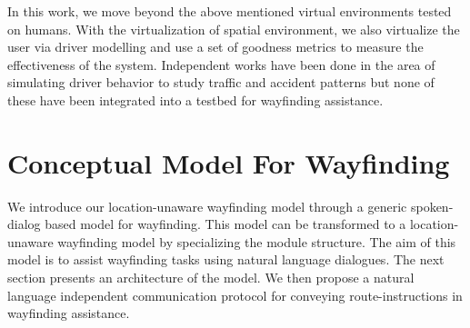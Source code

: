\documentclass{iitkthesis}
\begin{document}
In this work, we move beyond the above mentioned virtual environments tested on humans. With the virtualization of spatial environment, we also virtualize the user via driver modelling and use a set of goodness metrics to measure the effectiveness of the system. Independent works have been done in the area of simulating driver behavior to study traffic and accident patterns but none of these have been integrated into a testbed for wayfinding assistance.

 \chapter{Conceptual Model For Wayfinding}
We introduce our location-unaware wayfinding model through a generic spoken-dialog based model for wayfinding. This model can be transformed to a location-unaware wayfinding model by specializing the module structure. The aim of this model is to assist wayfinding tasks using natural language dialogues. The next section presents an architecture of the model. We then propose a natural language independent communication protocol for conveying route-instructions in wayfinding assistance.
\end{document}
